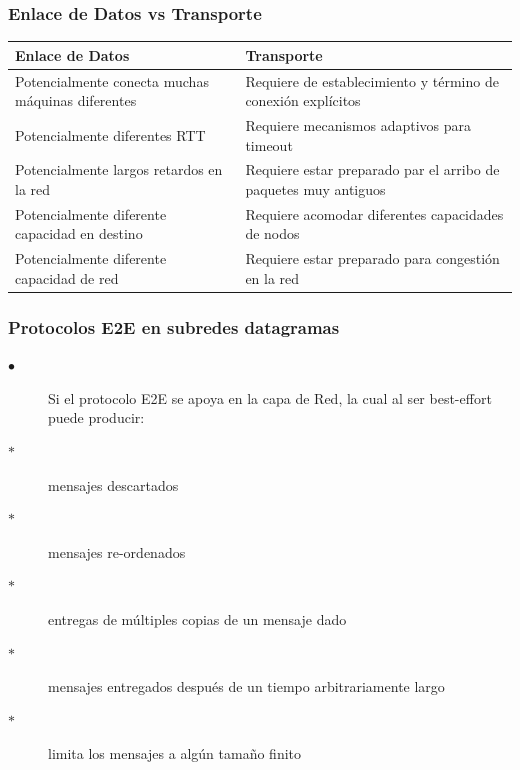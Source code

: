 \documentclass{beamer}
\begin{document}
	\begin{frame}
		\frametitle{Enlace de Datos vs Transporte}
	\begin{center}
	
		\begin{tabular}{| m{5cm} | m{5cm}| }
			\hline
			Enlace de Datos & Transporte  \\ 
			 \hline\hline
			 Potencialmente conecta   muchas máquinas diferentes &
			 Requiere de establecimiento y término de conexión explícitos  \\ 
			 \hline 
			Potencialmente diferentes RTT
			&
			Requiere mecanismos adaptivos para timeout \\ 
			\hline
			Potencialmente largos retardos en la red
			&
			Requiere estar preparado par el arribo de paquetes muy antiguos\\
			\hline  
			Potencialmente diferente capacidad en destino
			&
			Requiere acomodar diferentes capacidades de nodos\\
			\hline
			Potencialmente diferente capacidad de red
			&
			Requiere estar preparado para congestión en la red\\
			\hline
		\end{tabular}
	\end{center}
	\end{frame}
	\begin{frame}
	\frametitle{Protocolos E2E en subredes datagramas}
	  \begin{description}
	  	\item[$\bullet$] Si el protocolo E2E se apoya en la capa de Red, la cual al ser best-effort puede producir:\\
	  	\item[$\ast$] mensajes descartados 
	  	\item[$\ast$] mensajes re-ordenados
	  	\item[$\ast$] entregas de múltiples copias de un mensaje dado 
	    \item[$\ast$] mensajes entregados después de un tiempo arbitrariamente largo  
	    \item[$\ast$] limita los mensajes a algún tamaño finito
	  	
	  \end{description}
	  
	\end{frame}
\end{document}
